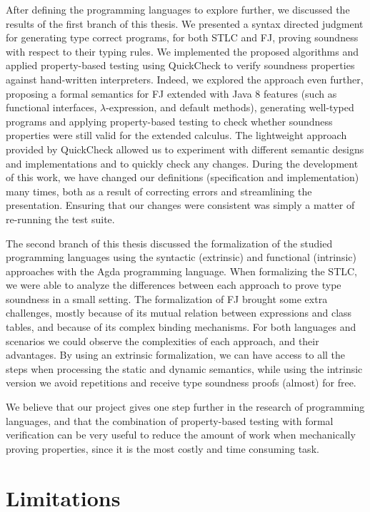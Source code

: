 \documentclass[tese,capa,english]{texufpel}
\begin{document}
After defining the programming languages to explore further, we discussed the results of the first branch of this thesis. We presented a syntax directed judgment for generating type correct programs, for both STLC and FJ, proving soundness with respect to their typing rules. We implemented the proposed algorithms and applied property-based testing using QuickCheck to verify soundness properties against hand-written interpreters. Indeed, we explored the approach even further, proposing a formal semantics for FJ extended with Java 8 features (such as functional interfaces, $\lambda$-expression, and default methods), generating well-typed programs and applying property-based testing to check whether soundness properties were still valid for the extended calculus. The lightweight approach provided by QuickCheck allowed us to experiment with different semantic designs and implementations and to quickly check any changes. During the development of this work, we have changed our definitions (specification and implementation) many times, both as a result of correcting errors and streamlining the presentation. Ensuring that our changes were consistent was simply a matter of re-running the test suite.

The second branch of this thesis discussed the formalization of the studied programming languages using the syntactic (extrinsic) and functional (intrinsic) approaches with the Agda programming language. When formalizing the STLC, we were able to analyze the differences between each approach to prove type soundness in a small setting. The formalization of FJ brought some extra challenges, mostly because of its mutual relation between expressions and class tables, and because of its complex binding mechanisms. For both languages and scenarios we could observe the complexities of each approach, and their advantages. By using an extrinsic formalization, we can have access to all the steps when processing the static and dynamic semantics, while using the intrinsic version we avoid repetitions and receive type soundness proofs (almost) for free. 

We believe that our project gives one step further in the research of programming languages, and that the combination of property-based testing with formal verification can be very useful to reduce the amount of work when mechanically proving properties, since it is the most costly and time consuming task. 

\section{Limitations}
\end{document}
